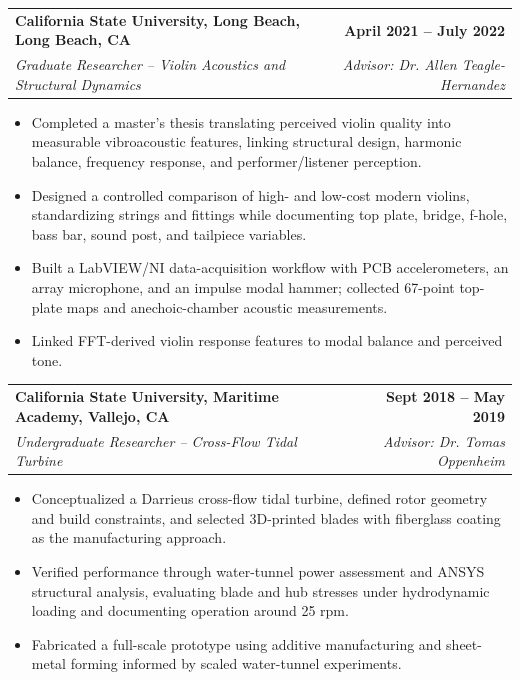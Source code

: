 \documentclass[10pt,letterpaper]{article}
\makeatletter
\newcommand{\roleentry}[4]{%
  \begin{tabularx}{\textwidth}{@{}>{\raggedright\arraybackslash}X r@{}}
    \textbf{#1} & \textbf{#2}\\
    \textit{\textcolor{muted}{#3}} & \textit{\textcolor{muted}{#4}}
  \end{tabularx}
  \vspace{-2pt}
}
\makeatother
\begin{document}
\roleentry{California State University, Long Beach, Long Beach, CA}{April 2021 -- July 2022}{Graduate Researcher -- Violin Acoustics and Structural Dynamics}{Advisor: Dr. Allen Teagle-Hernandez}
\begin{itemize}
  \item Completed a master's thesis translating perceived violin quality into measurable vibroacoustic features, linking structural design, harmonic balance, frequency response, and performer/listener perception.
  \item Designed a controlled comparison of high- and low-cost modern violins, standardizing strings and fittings while documenting top plate, bridge, f-hole, bass bar, sound post, and tailpiece variables.
  \item Built a LabVIEW/NI data-acquisition workflow with PCB accelerometers, an array microphone, and an impulse modal hammer; collected 67-point top-plate maps and anechoic-chamber acoustic measurements.
  \item Linked FFT-derived violin response features to modal balance and perceived tone.
\end{itemize}

\roleentry{California State University, Maritime Academy, Vallejo, CA}{Sept 2018 -- May 2019}{Undergraduate Researcher -- Cross-Flow Tidal Turbine}{Advisor: Dr. Tomas Oppenheim}
\begin{itemize}
  \item Conceptualized a Darrieus cross-flow tidal turbine, defined rotor geometry and build constraints, and selected 3D-printed blades with fiberglass coating as the manufacturing approach.
  \item Verified performance through water-tunnel power assessment and ANSYS structural analysis, evaluating blade and hub stresses under hydrodynamic loading and documenting operation around 25 rpm.
  \item Fabricated a full-scale prototype using additive manufacturing and sheet-metal forming informed by scaled water-tunnel experiments.
\end{itemize}
\end{document}
